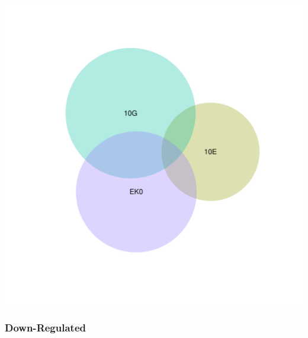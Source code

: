 \documentclass{article}\usepackage[]{graphicx}\usepackage[]{color}
\newenvironment{knitrout}{}{} %
\begin{document}
\begin{knitrout}
\color{fgcolor}

{\centering \includegraphics[width=1\linewidth,height=.4\textheight]{figure/minimal-venn_t2_3fc_up_euler-1} 

}



\end{knitrout}
\clearpage
\subsubsection{Down-Regulated}
\end{document}
